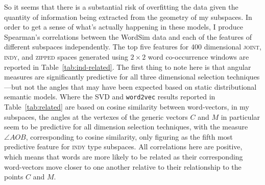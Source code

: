 So it seems that there is a substantial risk of overfitting the data given the quantity of information being extracted from the geometry of my subspaces.  In order to get a sense of what's actually happening in these models, I produce Spearman's correlations between the WordSim data and each of the features of different subspaces independently.  The top five features for 400 dimensional \textsc{joint}, \textsc{indy}, and \textsc{zipped} spaces generated using $2 \times 2$ word co-occurrence windows are reported in Table~\ref{tab:ind-related}.  The first thing to note here is that angular measures are significantly predictive for all three dimensional selection techniques---but not the angles that may have been expected based on static distributional semantic models.  Where the SVD and \texttt{word2vec} results reported in Table~\ref{tab:related} are based on cosine similarity between word-vectors, in my subspaces, the angles at the vertexes of the generic vectors $C$ and $M$ in particular seem to be predictive for all dimension selection techniques, with the measure $\angle AOB$, corresponding to cosine similarity, only figuring as the fifth most predictive feature for \textsc{indy} type subspaces.  All correlations here are positive, which means that words are more likely to be related as their corresponding word-vectors move closer to one another relative to their relationship to the points $C$ and $M$.


